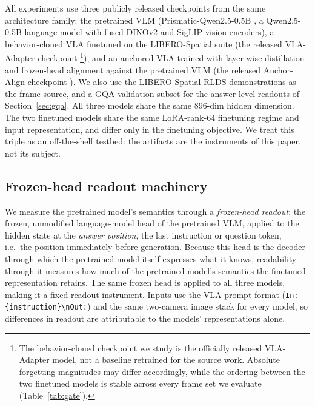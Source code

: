 \documentclass{article}
\begin{document}
All experiments use three publicly released checkpoints from the same architecture family: the
pretrained VLM (Prismatic-Qwen2.5-0.5B \cite{karamcheti2024prismatic,yang2024qwen25}, a
Qwen2.5-0.5B language model with fused DINOv2 \cite{oquab2024dinov2} and SigLIP
\cite{zhai2023siglip} vision encoders), a behavior-cloned VLA finetuned on the LIBERO-Spatial
suite (the released VLA-Adapter checkpoint \cite{wang2025vlaadapter}\footnote{The
behavior-cloned checkpoint we study is the officially released VLA-Adapter model, not a
baseline retrained for the source work. Absolute forgetting magnitudes may differ
accordingly, while the ordering between the two finetuned models is stable across every
frame set we evaluate (Table~\ref{tab:gate}).}), and an anchored VLA
trained with layer-wise distillation and frozen-head alignment against the pretrained VLM
(the released Anchor-Align checkpoint \cite{dalal2026anchoralign}). We also use the LIBERO-Spatial RLDS demonstrations
\cite{liu2023libero,oneill2024openx} as the frame source, and a GQA validation subset
\cite{hudson2019gqa} for the answer-level readouts of
Section~\ref{sec:gqa}. All three models share the same 896-dim hidden dimension. The two finetuned models
share the same LoRA-rank-64 finetuning regime \cite{hu2022lora} and input representation,
and differ only in the finetuning objective. We treat this triple as an off-the-shelf testbed:
the artifacts are the instruments of this paper, not its subject.

\subsection{Frozen-head readout machinery}
\label{sec:readout}

We measure the pretrained model's semantics through a \emph{frozen-head readout}: the frozen,
unmodified language-model head of the pretrained VLM, applied to the hidden state at the
\emph{answer position}, the last instruction or question token, i.e.\ the position
immediately before generation. Because this head is the decoder through which the pretrained
model itself expresses what it knows, readability through it measures how much of the
pretrained model's semantics the finetuned representation retains. The same frozen head is
applied to all three models, making it a fixed readout instrument. Inputs use the VLA prompt format
(\texttt{In: \{instruction\}\textbackslash nOut:}) and the same two-camera image stack for every
model, so differences in readout are attributable to the models' representations alone.
\end{document}
